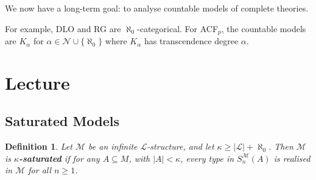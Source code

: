 \documentclass[]{article}
\theoremstyle{custhm}
\theoremstyle{cusdef}
\newtheorem{defin}[theorem]{Definition}
\theoremstyle{custhm}
\theoremstyle{custhm}
\theoremstyle{custhm}
\theoremstyle{ex}
\theoremstyle{custhm}
\theoremstyle{cusdef}
\theoremstyle{remark}
\theoremstyle{remark}
\theoremstyle{numremark}
\newcommand{\undf}[1]{\textit{\textbf{#1}}}
\renewcommand{\L}{\mathcal{L}}
\newcommand{\M}{\mathcal{M}}
\newcommand{\N}{\mathcal{N}}
\newcommand{\sman}{S_n^\M(A)}
\renewcommand{\subset}{\subseteq}
\begin{document}
We now have a long-term goal: to analyse countable models of complete theories.

For example, DLO and RG are $\aleph_0$-categorical. For ACF$_p$, the countable models are $K_\alpha$ for $\alpha \in \N\cup\{\aleph_0\}$ where $K_\alpha$ has transcendence degree $\alpha$.

\section{Lecture}

\subsection*{Saturated Models}

\begin{defin}
Let $\M$ be an infinite $\L$-structure, and let $\kappa \ge |\L| + \aleph_0$. Then $\M$ is \undf{$\kappa$-saturated} if for any $A\subset M$, with $|A| < \kappa$, every type in $\sman$ is realised in $\M$ for all $n\ge 1$.
\end{defin}
\end{document}
